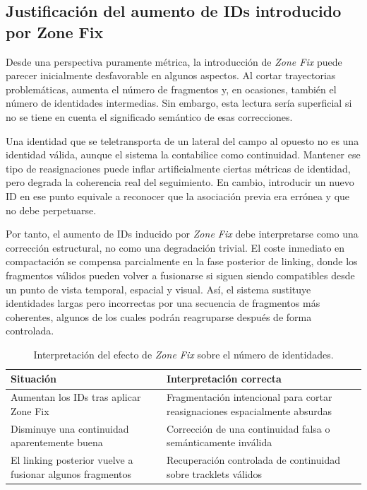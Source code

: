 \documentclass[../MAIN.tex]{subfiles}
\begin{document}
	\subsection{Justificación del aumento de IDs introducido por Zone Fix}
	
	Desde una perspectiva puramente métrica, la introducción de \textit{Zone Fix} puede parecer inicialmente desfavorable en algunos aspectos. Al cortar trayectorias problemáticas, aumenta el número de fragmentos y, en ocasiones, también el número de identidades intermedias. Sin embargo, esta lectura sería superficial si no se tiene en cuenta el significado semántico de esas correcciones.
	
	Una identidad que se teletransporta de un lateral del campo al opuesto no es una identidad válida, aunque el sistema la contabilice como continuidad. Mantener ese tipo de reasignaciones puede inflar artificialmente ciertas métricas de identidad, pero degrada la coherencia real del seguimiento. En cambio, introducir un nuevo ID en ese punto equivale a reconocer que la asociación previa era errónea y que no debe perpetuarse.
	
	Por tanto, el aumento de IDs inducido por \textit{Zone Fix} debe interpretarse como una corrección estructural, no como una degradación trivial. El coste inmediato en compactación se compensa parcialmente en la fase posterior de linking, donde los fragmentos válidos pueden volver a fusionarse si siguen siendo compatibles desde un punto de vista temporal, espacial y visual. Así, el sistema sustituye identidades largas pero incorrectas por una secuencia de fragmentos más coherentes, algunos de los cuales podrán reagruparse después de forma controlada.
	
	\begin{table}[H]
		\centering
		\caption{Interpretación del efecto de \textit{Zone Fix} sobre el número de identidades.}
		\label{tab:cap12_zonefix_interpretacion}
		\begin{tabular}{p{5.1cm}p{7.6cm}}
			\toprule
			\textbf{Situación} & \textbf{Interpretación correcta} \\
			\midrule
			Aumentan los IDs tras aplicar Zone Fix & Fragmentación intencional para cortar reasignaciones espacialmente absurdas \\
			Disminuye una continuidad aparentemente buena & Corrección de una continuidad falsa o semánticamente inválida \\
			El linking posterior vuelve a fusionar algunos fragmentos & Recuperación controlada de continuidad sobre tracklets válidos \\
			\bottomrule
		\end{tabular}
	\end{table}
	
\end{document}
